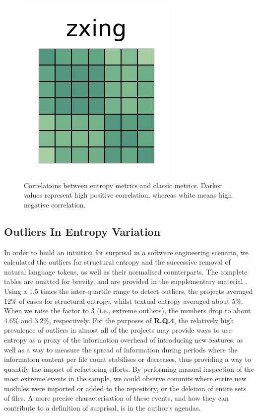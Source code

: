 \documentclass[10pt,conference]{IEEEtran}
\begin{document}
\begin{figure}[htb!]
 \includegraphics[width=\heatmapWidth, keepaspectratio]{correlations-classic/zxing-grids.png} 
\caption{Correlations between entropy metrics and classic metrics. Darker values represent high positive correlation, whereas white means high negative correlation.}
\label{fig:classic-correlations}
\end{figure}

\subsection{Outliers In Entropy Variation}
In order to build an intuition for surprisal in a software engineering scenario, we calculated the outliers for structural entropy and the successive removal of natural language tokens, as well as their normalised counterparts. The complete tables are omitted for brevity, and are provided in the supplementary material \cite{anonymousRepo}.
Using a 1.5 times the inter-quartile range to detect outliers, the projects averaged 12\% of cases for structural entropy, whilst textual entropy averaged about 5\%. When we raise the factor to 3 (i.e., extreme outliers), the numbers drop to about 4.6\% and 3.2\%, respectively. For the purposes of \textbf{R.Q.4}, the relatively high prevalence of outliers in almost all of the projects may provide ways to use entropy as a proxy of the information overhead of introducing new features, as well as a way to measure the spread of information during periods where the information content per file count stabilises or decreases, thus providing a way to quantify the impact of refactoring efforts.
By performing manual inspection of the most extreme events in the sample, we could observe commits where entire new modules were imported or added to the repository, or the deletion of entire sets of files. A more precise characterisation of these events, and how they can contribute to a definition of surprisal, is in the author's agendas.
\end{document}
